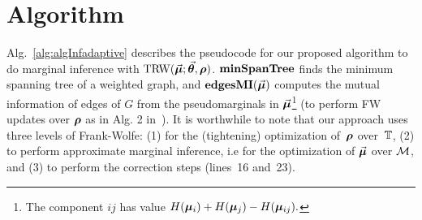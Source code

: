 \vspace{-2mm}
\section{Algorithm}
\vspace{-3mm}

Alg.~\ref{alg:algInfadaptive}
describes the pseudocode for our proposed algorithm to do marginal inference with $\text{TRW}(\vec{\bm{\mu}};\vec{\bm{\theta}},\bm{\rho})$. 
$\textrm{\textbf{minSpanTree}}$ finds the minimum spanning tree of a
weighted graph, and $\textbf{\textrm{edgesMI}}(\vec{\bm{\mu}})$ computes the mutual information of edges of $G$ 
from the pseudomarginals in $\vec{\bm{\mu}}$\footnote{The component $ij$ has value $H(\bm{\mu}_i)+H(\bm{\mu}_j)-H(\bm{\mu}_{ij}).$}
(to perform FW updates over $\bm{\rho}$ as in Alg. 2 in~\citet{wainwright2005new}).
It is worthwhile to note that our approach uses three levels of Frank-Wolfe: (1) for the (tightening) optimization
of~$\bm{\rho}$ over~$\mathbb{T}$, (2) to perform approximate marginal inference, i.e for the optimization of $\vec{\bm{\mu}}$ over $\mathcal{M}$, and (3) to perform the correction steps (lines~16 and~23).
%
%
%
